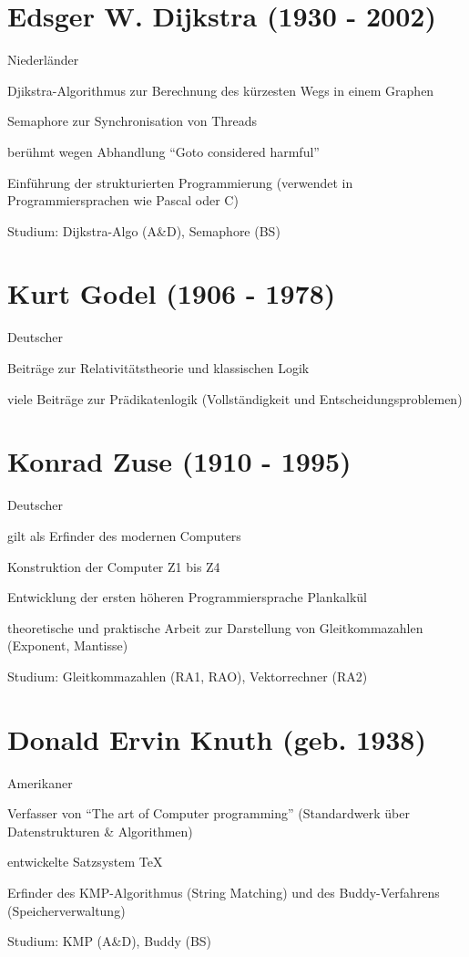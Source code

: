 \documentclass[a4paper,12pt]{report}
\begin{document}
\section{Edsger W. Dijkstra (1930 - 2002)}
\begin{itemize*}
	\item Niederländer
	\item Djikstra-Algorithmus zur Berechnung des kürzesten Wegs in einem Graphen
	\item Semaphore zur Synchronisation von Threads
	\item berühmt wegen Abhandlung ``Goto considered harmful''
	\item Einführung der strukturierten Programmierung (verwendet in Programmiersprachen wie Pascal oder C)
	\item Studium: Dijkstra-Algo (A\&D), Semaphore (BS)
\end{itemize*}

\section{Kurt Godel (1906 - 1978)}
\begin{itemize*}
	\item Deutscher
	\item Beiträge zur Relativitätstheorie und klassischen Logik
	\item viele Beiträge zur Prädikatenlogik (Vollständigkeit und Entscheidungsproblemen)
\end{itemize*}

\section{Konrad Zuse (1910 - 1995)}
\begin{itemize*}
	\item Deutscher
	\item gilt als Erfinder des modernen Computers
	\item Konstruktion der Computer Z1 bis Z4
	\item Entwicklung der ersten höheren Programmiersprache Plankalkül
	\item theoretische und praktische Arbeit zur Darstellung von Gleitkommazahlen (Exponent, Mantisse)
	\item Studium: Gleitkommazahlen (RA1, RAO), Vektorrechner (RA2)
\end{itemize*}

\section{Donald Ervin Knuth (geb. 1938)}
\begin{itemize*}
	\item Amerikaner
	\item Verfasser von ``The art of Computer programming'' (Standardwerk über Datenstrukturen \& Algorithmen)
	\item entwickelte Satzsystem TeX
	\item Erfinder des KMP-Algorithmus (String Matching) und des Buddy-Verfahrens (Speicherverwaltung)
	\item Studium: KMP (A\&D), Buddy (BS)
\end{itemize*}
\end{document}
